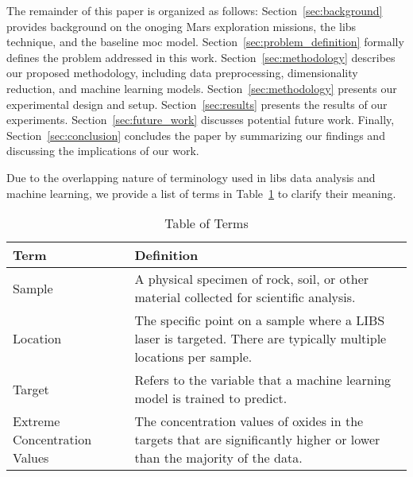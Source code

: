 The remainder of this paper is organized as follows:
Section~\ref{sec:background} provides background on the onoging Mars exploration missions, the \gls{libs} technique, and the baseline \gls{moc} model.
Section~\ref{sec:problem_definition} formally defines the problem addressed in this work.
Section~\ref{sec:methodology} describes our proposed methodology, including data preprocessing, dimensionality reduction, and machine learning models.
Section~\ref{sec:methodology} presents our experimental design and setup.
Section~\ref{sec:results} presents the results of our experiments.
Section~\ref{sec:future_work} discusses potential future work.
Finally, Section~\ref{sec:conclusion} concludes the paper by summarizing our findings and discussing the implications of our work.

Due to the overlapping nature of terminology used in \gls{libs} data analysis and machine learning, we provide a list of terms in Table~\ref{tab:terms} to clarify their meaning.

\begin{table}
\centering
\begin{tabularx}{\columnwidth}{lX} %
\toprule
Term & Definition \\
\midrule
Sample & A physical specimen of rock, soil, or other material collected for scientific analysis.\\
Location & The specific point on a sample where a LIBS laser is targeted. There are typically multiple locations per sample. \\
Target & Refers to the variable that a machine learning model is trained to predict. \\
Extreme Concentration Values & The concentration values of oxides in the targets that are significantly higher or lower than the majority of the data. \\
\bottomrule
\end{tabularx}
\caption{Table of Terms}
\label{tab:terms}
\end{table}